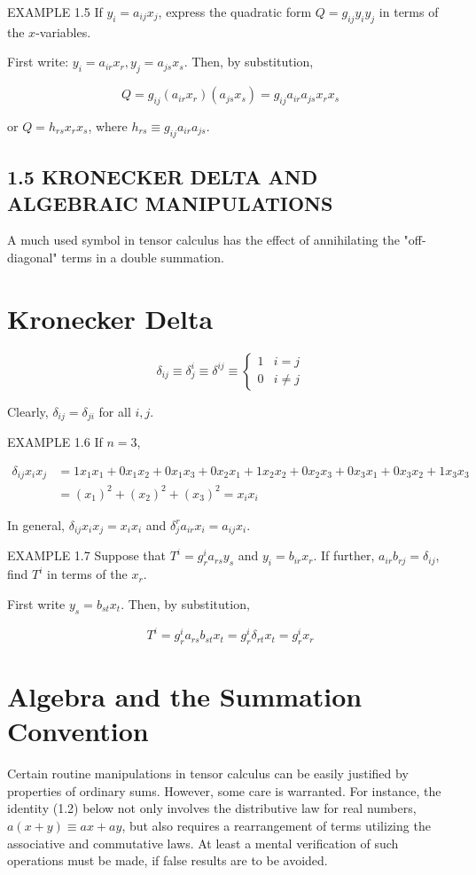 \documentclass[10pt]{article}
\begin{document}
EXAMPLE 1.5 If $y_{i}=a_{i j} x_{j}$, express the quadratic form $Q=g_{i j} y_{i} y_{j}$ in terms of the $x$-variables.

First write: $y_{i}=a_{i r} x_{r}, y_{j}=a_{j s} x_{s}$. Then, by substitution,

$$
Q=g_{i j}\left(a_{i r} x_{r}\right)\left(a_{j s} x_{s}\right)=g_{i j} a_{i r} a_{j s} x_{r} x_{s}
$$

or $Q=h_{r s} x_{r} x_{s}$, where $h_{r s} \equiv g_{i j} a_{i r} a_{j s}$.

\subsection*{1.5 KRONECKER DELTA AND ALGEBRAIC MANIPULATIONS}
A much used symbol in tensor calculus has the effect of annihilating the "off-diagonal" terms in a double summation.

\section*{Kronecker Delta}
\[
\delta_{i j} \equiv \delta_{j}^{i} \equiv \delta^{i j} \equiv \begin{cases}1 & i=j  \tag{1.1}\\ 0 & i \neq j\end{cases}
\]

Clearly, $\delta_{i j}=\delta_{j i}$ for all $i, j$.

EXAMPLE 1.6 If $n=3$,

$$
\begin{aligned}
\delta_{i j} x_{i} x_{j} & =1 x_{1} x_{1}+0 x_{1} x_{2}+0 x_{1} x_{3}+0 x_{2} x_{1}+1 x_{2} x_{2}+0 x_{2} x_{3}+0 x_{3} x_{1}+0 x_{3} x_{2}+1 x_{3} x_{3} \\
& =\left(x_{1}\right)^{2}+\left(x_{2}\right)^{2}+\left(x_{3}\right)^{2}=x_{i} x_{i}
\end{aligned}
$$

In general, $\delta_{i j} x_{i} x_{j}=x_{i} x_{i}$ and $\delta_{j}^{r} a_{i r} x_{i}=a_{i j} x_{i}$.

EXAMPLE 1.7 Suppose that $T^{i}=g_{r}^{i} a_{r s} y_{s}$ and $y_{i}=b_{i r} x_{r}$. If further, $a_{i r} b_{r j}=\delta_{i j}$, find $T^{i}$ in terms of the $x_{r}$.

First write $y_{s}=b_{s t} x_{t}$. Then, by substitution,

$$
T^{i}=g_{r}^{i} a_{r s} b_{s t} x_{t}=g_{r}^{i} \delta_{r t} x_{t}=g_{r}^{i} x_{r}
$$

\section*{Algebra and the Summation Convention}
Certain routine manipulations in tensor calculus can be easily justified by properties of ordinary sums. However, some care is warranted. For instance, the identity (1.2) below not only involves the distributive law for real numbers, $a(x+y) \equiv a x+a y$, but also requires a rearrangement of terms utilizing the associative and commutative laws. At least a mental verification of such operations must be made, if false results are to be avoided.
\end{document}
